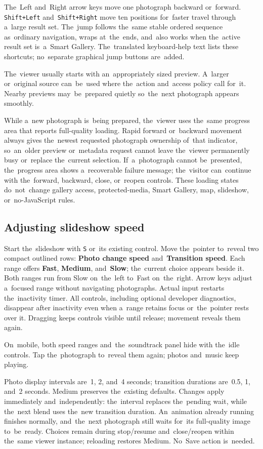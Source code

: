\documentclass[11pt,a4paper]{article}
\newcommand{\ui}[1]{\textbf{#1}}
\newcommand{\codeword}[1]{\nolinkurl{#1}}
\begin{document}
The~Left and~Right arrow keys move one photograph backward or~forward.
\codeword{Shift+Left} and~\codeword{Shift+Right} move ten positions for~faster
travel through a~large result set. The~jump follows the~same stable ordered
sequence as~ordinary navigation, wraps at~the~ends, and~also works when
the~active result set is~a~Smart Gallery. The~translated keyboard-help text
lists these shortcuts; no~separate graphical jump buttons are~added.

The~viewer usually starts with an~appropriately sized preview. A~larger
or~original source can~be~used where the~action and~access policy call for~it.
Nearby previews may~be~prepared quietly so~the~next photograph appears smoothly.

While a~new photograph is~being prepared, the~viewer uses the~same progress area
that reports full-quality loading. Rapid forward or~backward movement always
gives the~newest requested photograph ownership of~that indicator, so~an~older
preview or~metadata request cannot leave the~viewer permanently busy or~replace
the~current selection. If~a~photograph cannot be~presented, the~progress area
shows a~recoverable failure message; the~visitor can~continue with the~forward,
backward, close, or~reopen controls. These loading states do~not~change gallery
access, protected-media, Smart Gallery, map, slideshow, or~no-JavaScript rules.

\subsection{Adjusting slideshow speed}

Start the~slideshow with \codeword{S} or~its existing control. Move the~pointer
to~reveal two compact outlined rows: \ui{Photo change speed} and~\ui{Transition
speed}. Each range offers \ui{Fast}, \ui{Medium}, and~\ui{Slow}; the~current
choice appears beside it. Both ranges run from Slow on~the~left to~Fast
on~the~right. Arrow keys adjust a~focused range without navigating photographs.
Actual input restarts the~inactivity timer. All controls, including optional
developer diagnostics, disappear after inactivity even when a~range retains
focus or~the~pointer rests over it. Dragging keeps controls visible until
release; movement reveals them again.

On~mobile, both speed ranges and~the~soundtrack panel hide with the~idle
controls. Tap the~photograph to~reveal them again; photos and~music keep
playing.

Photo display intervals are~1, 2, and~4 seconds; transition durations are~0.5,
1, and~2 seconds. Medium preserves the~existing defaults. Changes apply
immediately and~independently: the~interval replaces the~pending wait, while
the~next blend uses the~new transition duration. An~animation already running
finishes normally, and~the~next photograph still waits for~its full-quality
image to~be~ready. Choices remain during stop/resume and~close/reopen within
the~same viewer instance; reloading restores Medium. No~Save action is~needed.
\end{document}
